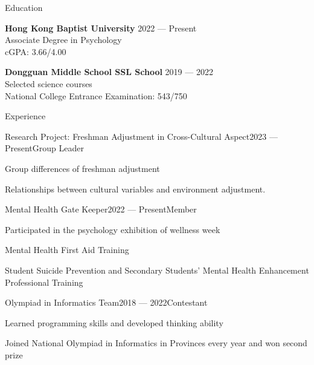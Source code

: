 \documentclass[
	11pt, %
]{resume} %
\begin{document}
\begin{rSection}{Education}

    \textbf{Hong Kong Baptist University} \hfill 2022 --- Present \\
    Associate Degree in Psychology \\
    cGPA: 3.66/4.00

    \textbf{Dongguan Middle School SSL School} \hfill 2019 --- 2022 \\
    Selected science courses \\
    National College Entrance Examination: 543/750

\end{rSection}


\begin{rSection}{Experience}

    \begin{rSubsection}{Research Project: Freshman Adjustment in Cross-Cultural Aspect}{2023 --- Present}{Group Leader}{}
        \item Group differences of freshman adjustment
        \item Relationships between cultural variables and environment adjustment.
    \end{rSubsection}

    \begin{rSubsection}{Mental Health Gate Keeper}{2022 --- Present}{Member}{}
        \item Participated in the psychology exhibition of wellness week
        \item Mental Health First Aid Training
        \item Student Suicide Prevention and Secondary Students' Mental Health Enhancement Professional Training
    \end{rSubsection}

    \begin{rSubsection}{Olympiad in Informatics Team}{2018 --- 2022}{Contestant}{}
        \item Learned programming skills and developed thinking ability
        \item Joined National Olympiad in Informatics in Provinces every year and won second prize
    \end{rSubsection}

\end{rSection}
\end{document}
